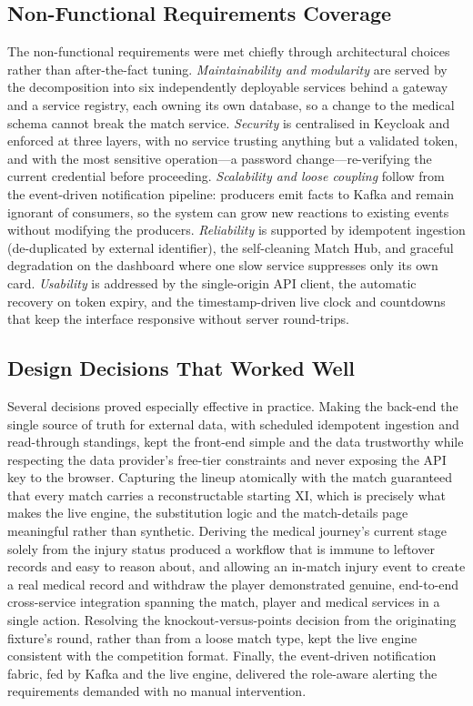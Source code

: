 \subsection{Non-Functional Requirements Coverage}
The non-functional requirements were met chiefly through architectural choices rather than after-the-fact tuning.
\emph{Maintainability and modularity} are served by the decomposition into six independently deployable services behind a
gateway and a service registry, each owning its own database, so a change to the medical schema cannot break the match
service. \emph{Security} is centralised in Keycloak and enforced at three layers, with no service trusting anything but a
validated token, and with the most sensitive operation---a password change---re-verifying the current credential before
proceeding. \emph{Scalability and loose coupling} follow from the event-driven notification pipeline: producers emit facts
to Kafka and remain ignorant of consumers, so the system can grow new reactions to existing events without modifying the
producers. \emph{Reliability} is supported by idempotent ingestion (de-duplicated by external identifier), the self-cleaning
Match Hub, and graceful degradation on the dashboard where one slow service suppresses only its own card. \emph{Usability}
is addressed by the single-origin API client, the automatic recovery on token expiry, and the timestamp-driven live clock and
countdowns that keep the interface responsive without server round-trips.

\subsection{Design Decisions That Worked Well}
Several decisions proved especially effective in practice. Making the back-end the single source of truth for external data,
with scheduled idempotent ingestion and read-through standings, kept the front-end simple and the data trustworthy while
respecting the data provider's free-tier constraints and never exposing the API key to the browser. Capturing the lineup
atomically with the match guaranteed that every match carries a reconstructable starting XI, which is precisely what makes the
live engine, the substitution logic and the match-details page meaningful rather than synthetic. Deriving the medical journey's
current stage solely from the injury status produced a workflow that is immune to leftover records and easy to reason about, and
allowing an in-match injury event to create a real medical record and withdraw the player demonstrated genuine, end-to-end
cross-service integration spanning the match, player and medical services in a single action. Resolving the knockout-versus-points
decision from the originating fixture's round, rather than from a loose match type, kept the live engine consistent with the
competition format. Finally, the event-driven notification fabric, fed by Kafka and the live engine, delivered the role-aware
alerting the requirements demanded with no manual intervention.

